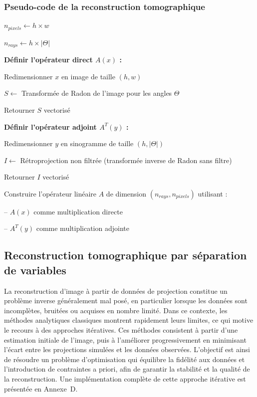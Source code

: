 \subsubsection*{Pseudo-code de la reconstruction tomographique}
\begin{algorithm}[H]
    \caption{Création de l'opérateur système CT $A$ et de son adjoint $A^T$}

    $n_{pixels} \leftarrow h \times w$\;

    $n_{rays} \leftarrow h \times |\Theta|$\;

    \vspace{0.3cm}
    \textbf{Définir l'opérateur direct $A(x)$ :}

    \Indp
    Redimensionner $x$ en image de taille $(h,w)$\;

    $S \leftarrow$ Transformée de Radon de l'image pour les angles $\Theta$\;

    Retourner $S$ vectorisé\;
    \Indm

    \vspace{0.3cm}
    \textbf{Définir l'opérateur adjoint $A^T(y)$ :}

    \Indp
    Redimensionner $y$ en sinogramme de taille $(h, |\Theta|)$\;

    $I \leftarrow$ Rétroprojection non filtrée (transformée inverse de Radon sans filtre)\;

    Retourner $I$ vectorisé\;
    \Indm

    \vspace{0.3cm}
    Construire l'opérateur linéaire $A$ de dimension 
    $(n_{rays}, n_{pixels})$ utilisant :

    \Indp
    \quad -- $A(x)$ comme multiplication directe\;

    \quad -- $A^T(y)$ comme multiplication adjointe\;
    \Indm

    \;
\end{algorithm}

\subsection{Reconstruction tomographique par séparation de variables}
La reconstruction d'image à partir de données de projection constitue un problème inverse généralement mal posé, en particulier lorsque les données sont incomplètes, bruitées ou acquises en nombre limité. Dans ce contexte, les méthodes analytiques classiques montrent rapidement leurs limites, ce qui motive le recours à des approches itératives. Ces méthodes consistent à partir d'une estimation initiale de l'image, puis à l'améliorer progressivement en minimisant l'écart entre les projections simulées et les données observées. L'objectif est ainsi de résoudre un problème d'optimisation qui équilibre la fidélité aux données et l'introduction de contraintes a priori, afin de garantir la stabilité et la qualité de la reconstruction. Une implémentation complète de cette approche itérative est présentée en Annexe~D.

